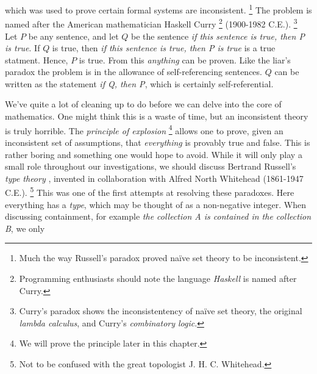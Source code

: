          which was
        used to prove certain formal systems are inconsistent.%
        \footnote{%
            Much the way Russell's paradox proved na\"{i}ve set theory to
            be inconsistent.
        }
        The problem is named after the American mathematician
        Haskell Curry%
        \footnote{%
            Programming enthusiasts should note the language
            \textit{Haskell} is named after Curry.
        }
        (1900-1982 C.E.).%
        \footnote{%
            Curry's paradox shows the inconsistentency of na\"{i}ve set theory,
            the original \textit{lambda calculus}, and Curry's
            \textit{combinatory logic}.
        }
        Let $P$ be any sentence, and let $Q$ be the sentence
        \textit{if this sentence is true, then P is true}. If $Q$ is true, then
        \textit{if this sentence is true, then P is true} is a true statment.
        Hence, $P$ is true. From this \textit{anything} can be proven. Like the
        liar's paradox the problem is in the allowance of self-referencing
        sentences. $Q$ can be written as the statement \textit{if Q, then P},
        which is certainly self-referential.
        \par\hfill\par
        We've quite a lot of cleaning up to do before we can delve into the core
        of mathematics. One might think this is a waste of time, but an
        inconsistent theory is truly horrible. The
        \textit{principle of explosion}%
        \footnote{We will prove the principle later in this chapter.}
        allows one to prove, given an inconsistent set of assumptions, that
        \textit{everything} is provably true and false. This is rather boring
        and something one would hope to avoid. While it will only play a small
        role throughout our investigations, we should discuss Bertrand
        Russell's \textit{type theory}%
        , invented in collaboration with
        Alfred North Whitehead
        (1861-1947 C.E.).%
        \footnote{%
            Not to be confused with the great topologist J. H. C. Whitehead.
        }
        This was one of the first attempts at resolving these paradoxes. Here
        everything has a \textit{type}, which may be thought of as a
        non-negative integer. When discussing containment, for example
        \textit{the collection A is contained in the collection B}, we only
